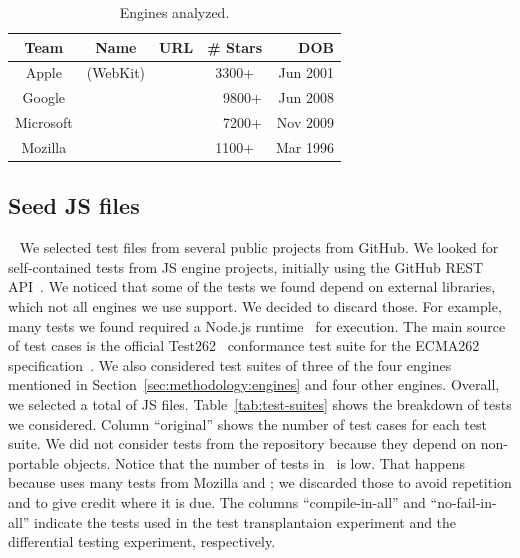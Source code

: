 \documentclass[10pt,conference,anonymous]{IEEEtran}
\begin{document}

\begin{table}[t]
  \centering
  \caption{\label{tab:engines}Engines analyzed.}
  \begin{tabular}{cccrr}
    \toprule
    Team & Name & URL & \# Stars  & DOB \\
    \midrule
    Apple & \jsc{} (WebKit) & \cite{jsc2018repo} &
    \multicolumn{1}{c}{3300+} & Jun 2001\\
    Google & \veight{} & \cite{v82018repo} & 9800+ & Jun 2008\\
    Microsoft & \chakra{} & \cite{chakra2018repo} & 7200+ & Nov 2009\\
    Mozilla & \smonkey{} & \cite{spidermonkey2018repo} &
    \multicolumn{1}{c}{1100+} & Mar 1996\\
   \bottomrule     
  \end{tabular}
\end{table}

\subsection{Seed JS files\label{sec:seeds}}~
We selected test files from several public projects from GitHub. We
looked for self-contained tests from JS engine projects, initially
using the GitHub REST API~\cite{github-rest-api}. We noticed that some
of the tests we found depend on external libraries, which not all
engines we use support. We decided to discard those. For example, many
tests we found required a Node.js runtime~\cite{node} for
execution. The main source of test cases is the official
Test262~\cite{tc39-github} conformance test suite for the ECMA262
specification~\cite{ecmas262-spec}. We also considered test suites of
three of the four engines mentioned in
Section~\ref{sec:methodology:engines} and four other engines. Overall,
we selected a total of \totfiles{} JS
files. Table~\ref{tab:test-suites} shows the breakdown of tests we
considered. Column ``original'' shows the number of test cases for
each test suite. We did not consider tests from the \chakra{}
repository because they depend on non-portable objects. Notice that
the number of tests in \veight\ is low. That happens because \veight{}
uses many tests from Mozilla and \jsc{}; we discarded those to avoid
repetition and to give credit where it is due. The columns
``compile-in-all'' and ``no-fail-in-all'' indicate the tests used in
the test transplantaion experiment and the differential testing
experiment, respectively.
\end{document}

